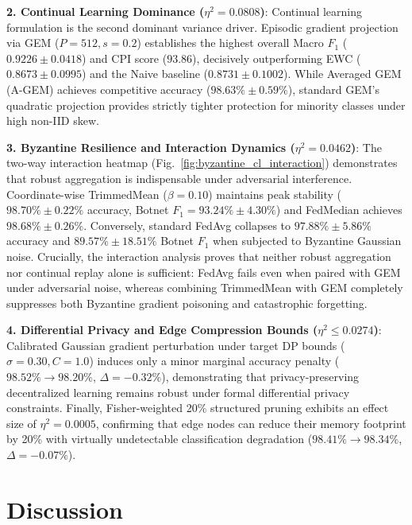 \documentclass[journal,10pt,twocolumn]{IEEEtran}
\begin{document}
\textbf{2. Continual Learning Dominance ($\eta^2 = 0.0808$)}: Continual learning formulation is the second dominant variance driver. Episodic gradient projection via GEM ($P=512, s=0.2$) establishes the highest overall Macro $F_1$ ($\mathbf{0.9226 \pm 0.0418}$) and CPI score ($\mathbf{93.86}$), decisively outperforming EWC ($0.8673 \pm 0.0995$) and the Naive baseline ($0.8731 \pm 0.1002$). While Averaged GEM (A-GEM) achieves competitive accuracy ($98.63\% \pm 0.59\%$), standard GEM's quadratic projection provides strictly tighter protection for minority classes under high non-IID skew.

\textbf{3. Byzantine Resilience and Interaction Dynamics ($\eta^2 = 0.0462$)}: The two-way interaction heatmap (Fig.~\ref{fig:byzantine_cl_interaction}) demonstrates that robust aggregation is indispensable under adversarial interference. Coordinate-wise TrimmedMean ($\beta=0.10$) maintains peak stability ($98.70\% \pm 0.22\%$ accuracy, Botnet $F_1 = 93.24\% \pm 4.30\%$) and FedMedian achieves $98.68\% \pm 0.26\%$. Conversely, standard FedAvg collapses to $97.88\% \pm 5.86\%$ accuracy and $89.57\% \pm 18.51\%$ Botnet $F_1$ when subjected to Byzantine Gaussian noise. Crucially, the interaction analysis proves that neither robust aggregation nor continual replay alone is sufficient: FedAvg fails even when paired with GEM under adversarial noise, whereas combining TrimmedMean with GEM completely suppresses both Byzantine gradient poisoning and catastrophic forgetting.

\textbf{4. Differential Privacy and Edge Compression Bounds ($\eta^2 \le 0.0274$)}: Calibrated Gaussian gradient perturbation under target DP bounds ($\sigma=0.30, C=1.0$) induces only a minor marginal accuracy penalty ($98.52\% \rightarrow 98.20\%$, $\Delta = -0.32\%$), demonstrating that privacy-preserving decentralized learning remains robust under formal differential privacy constraints. Finally, Fisher-weighted 20\% structured pruning exhibits an effect size of $\eta^2 = 0.0005$, confirming that edge nodes can reduce their memory footprint by 20\% with virtually undetectable classification degradation ($98.41\% \rightarrow 98.34\%$, $\Delta = -0.07\%$).



\section{Discussion}
\end{document}

